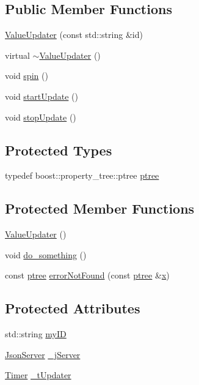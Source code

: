 \subsection*{Public Member Functions}
\begin{DoxyCompactItemize}
\item 
\hyperlink{class_value_updater_adb31fdab1c81e5e956d45f33420a5d4d}{Value\+Updater} (const std\+::string \&id)
\item 
virtual \hyperlink{class_value_updater_ad48a75a4f56eeaa0e8e8ef721606ce28}{$\sim$\+Value\+Updater} ()
\item 
void \hyperlink{class_value_updater_a334519af96fcf771be2bfb54bf96274e}{spin} ()
\item 
void \hyperlink{class_value_updater_af7cdc4716c12ed9a8ccab24a117517b9}{start\+Update} ()
\item 
void \hyperlink{class_value_updater_aa72bf4bf17ce87177105a93b8a4c1ed1}{stop\+Update} ()
\end{DoxyCompactItemize}
\subsection*{Protected Types}
\begin{DoxyCompactItemize}
\item 
typedef boost\+::property\+\_\+tree\+::ptree \hyperlink{class_value_updater_a3b22cec365a448f8d7854431ce104d9b}{ptree}
\end{DoxyCompactItemize}
\subsection*{Protected Member Functions}
\begin{DoxyCompactItemize}
\item 
\hyperlink{class_value_updater_aaed61479253764057c718191ac23ae0c}{Value\+Updater} ()
\item 
void \hyperlink{class_value_updater_a9626d825dd178c68ec7645b9cd4e0afc}{do\+\_\+something} ()
\item 
const \hyperlink{class_value_updater_a3b22cec365a448f8d7854431ce104d9b}{ptree} \hyperlink{class_value_updater_a601c97ec59b863d4c9ebccfa0309b2c2}{error\+Not\+Found} (const \hyperlink{class_value_updater_a3b22cec365a448f8d7854431ce104d9b}{ptree} \&\hyperlink{jquery_8js_a4c3eadaa5164016d2c340d495fc6e55e}{x})
\end{DoxyCompactItemize}
\subsection*{Protected Attributes}
\begin{DoxyCompactItemize}
\item 
std\+::string \hyperlink{class_value_updater_a5fb457df5b7c1546c77815e7ed3cf051}{my\+I\+D}
\item 
\hyperlink{class_json_server}{Json\+Server} \hyperlink{class_value_updater_a0919e0b45f8e3da0174e0db72f3b37fa}{\+\_\+j\+Server}
\item 
\hyperlink{class_timer}{Timer} \hyperlink{class_value_updater_a1ee7b4c634b4511dc14b64b6fbdf4294}{\+\_\+t\+Updater}
\end{DoxyCompactItemize}


